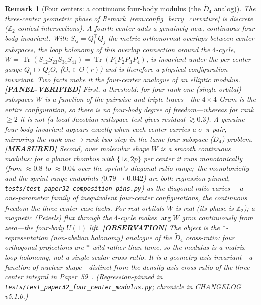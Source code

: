 \documentclass[11pt]{article}
\newtheorem{remark}{Remark}
\begin{document}
\begin{remark}[Four centers: a continuous four-body modulus (the $\tilde D_4$ analog)]
\label{rem:four_center_modulus}
The three-center geometric phase of Remark~\ref{rem:config_berry_curvature}
is discrete ($\mathbb{Z}_2$ conical intersections).  A \emph{fourth} center
adds a genuinely new, \emph{continuous} four-body invariant.  With
$S_{ij}=Q_i^{\!\top}Q_j$ the metric-orthonormal overlaps between center
subspaces, the loop holonomy of this overlap connection around the
$4$-cycle,
$W=\operatorname{Tr}(S_{12}S_{23}S_{34}S_{41})=\operatorname{Tr}(P_1P_2P_3P_4)$,
is invariant under the per-center gauge $Q_i\mapsto Q_iO_i$ ($O_i\in O(r)$)
and is therefore a physical configuration invariant.  Two facts make it the
four-center analogue of an elliptic modulus.  \textbf{[PANEL-VERIFIED]} First, a \emph{threshold}: for
four rank-one (single-orbital) subspaces $W$ is a function of the pairwise
and triple traces---the $4\times4$ Gram is the entire configuration, so
there is no four-body degree of freedom---whereas for rank $\ge2$ it is not
(a local Jacobian-nullspace test gives residual $\gtrsim0.3$).  A genuine
four-body invariant appears exactly when each center carries a
$\sigma$--$\pi$ pair, mirroring the rank-one$\to$rank-two step in the tame
four-subspace ($\tilde D_4$) problem.  \textbf{[MEASURED]} Second, over molecular shape $W$ is a
\emph{smooth continuous modulus}: for a planar rhombus with $\{1s,2p\}$ per
center it runs monotonically (from $\approx 0.8$ to $\approx 0.04$ over
the sprint's diagonal-ratio range;\ the monotonicity and the sprint-range
endpoints ($0.79 \to 0.042$) are both regression-pinned,
\texttt{tests/test\_paper32\_composition\_pins.py}) as the diagonal ratio varies
---a one-parameter family of inequivalent four-center configurations, the
continuous freedom the three-center case lacks.  For real orbitals $W$ is
real (its phase is $\mathbb{Z}_2$); a magnetic (Peierls) flux through the
$4$-cycle makes $\arg W$ grow continuously from zero---the four-body $U(1)$
lift.  \textbf{[OBSERVATION]} The object is the $*$-representation (non-abelian holonomy) analogue
of the $\tilde D_4$ cross-ratio: four \emph{orthogonal} projections are
$*$-wild rather than tame, so the modulus is a matrix loop holonomy, not a
single scalar cross-ratio.  It is a geometry-axis invariant---a function of
nuclear shape---distinct from the density-axis cross-ratio of the
three-center integral in Paper~59~\cite{loutey_paper59}.  (Regression-pinned in
\texttt{tests/test\_paper32\_four\_center\_modulus.py}; chronicle in
CHANGELOG v5.1.0.)
\end{remark}
\end{document}
